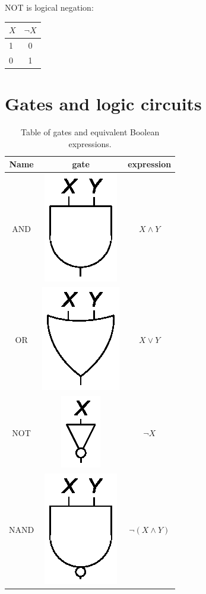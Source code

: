 \documentclass{article}
\begin{document}
NOT is logical negation:

\begin{tabular}{l|c}
	$X$ & $\lnot X$ \\
	\hline
	 1 & 0 \\
	 0 & 1 \\
\end{tabular}

\section{Gates and logic circuits}

\begin{table}
	\caption{Table of gates and equivalent Boolean expressions.}\label{gates}
	\begin{tabular}{|c|c|c|}
		\hline
		Name & gate & expression \\
		\hline\hline
		AND & \includegraphics{and_gate.eps} & $X \land Y$\\
		\hline
		OR & \includegraphics{or_gate.eps} & $X \lor Y$\\
		\hline
		NOT & \includegraphics{not_gate.eps} & $\lnot X$\\
		\hline
		NAND & \includegraphics{nand_gate.eps} & $\lnot(X \land Y)$\\

\end{tabular}
\end{table}
\end{document}
